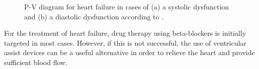 \begin{figure}
  \centering
  \caption{P-V diagram for heart failure in cases of (a) a systolic dysfunction and (b) a diastolic dysfunction according to \cite{HKS_pv}.}
  \label{fig:hf_dys}
\end{figure}

For the treatment of heart failure, drug therapy using beta-blockers is initially targeted in most cases. However, if this is not successful, the use of ventricular assist devices can be a useful alternative in order to relieve the heart and provide sufficient blood flow. \cite{HKS4}
